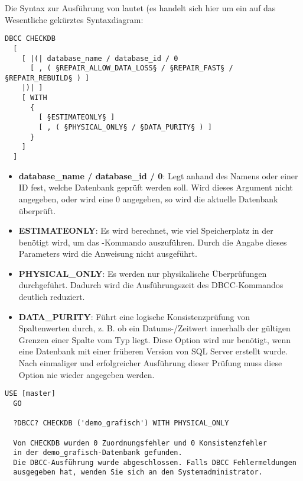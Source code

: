           Die Syntax zur Ausführung von  lautet
          (es handelt sich hier um ein auf das Wesentliche gekürztes
          Syntaxdiagram:
          \begin{lstlisting}[language=ebnf, caption={Die Syntax zu CHECKDB},
          label=admin03_28]
DBCC CHECKDB
  [
    [ |(| database_name / database_id / 0 
      [ , ( §REPAIR_ALLOW_DATA_LOSS§ / §REPAIR_FAST§ / §REPAIR_REBUILD§ ) ]
    |)| ]
    [ WITH
      {
        [ §ESTIMATEONLY§ ]
        [ , ( §PHYSICAL_ONLY§ / §DATA_PURITY§ ) ]
      }
    ]
  ]        
          \end{lstlisting}
          \begin{itemize}
            \item \textbf{database\_name / database\_id / 0}: Legt anhand des
            Namens oder einer ID fest, welche Datenbank geprüft werden soll.
            Wird dieses Argument nicht angegeben, oder wird eine 0 angegeben, so
            wird die aktuelle Datenbank überprüft.
            \item \textbf{ESTIMATEONLY}: Es wird berechnet, wie viel
            Speicherplatz in der  benötigt wird, um das
            -Kommando auszuführen. Durch die Angabe
            dieses Parameters wird die Anweisung nicht ausgeführt.
            \item \textbf{PHYSICAL\_ONLY}: Es werden nur physikalische
            Überprüfungen durchgeführt. Dadurch wird die Ausführungszeit des
            DBCC-Kommandos deutlich reduziert.
            \item \textbf{DATA\_PURITY}: Führt eine logische
            Konsistenzprüfung von Spaltenwerten durch, z. B. ob ein
            Datums-/Zeitwert innerhalb der gültigen Grenzen einer Spalte vom Typ
             liegt. Diese Option wird nur benötigt, wenn
            eine Datenbank mit einer früheren Version von SQL Server erstellt
            wurde. Nach einmaliger und erfolgreicher Ausführung dieser Prüfung
            muss diese Option nie wieder angegeben werden.
          \end{itemize}
          \begin{lstlisting}[language=ms_sql,caption={Physikalische
          Konsistenzprüfung einer Datenbank mit DBCC},label=admin03_29]
  USE [master]
  GO
  
  ?DBCC? CHECKDB ('demo_grafisch') WITH PHYSICAL_ONLY
  
  Von CHECKDB wurden 0 Zuordnungsfehler und 0 Konsistenzfehler 
  in der demo_grafisch-Datenbank gefunden.
  Die DBCC-Ausführung wurde abgeschlossen. Falls DBCC Fehlermeldungen
  ausgegeben hat, wenden Sie sich an den Systemadministrator.
          \end{lstlisting}         
